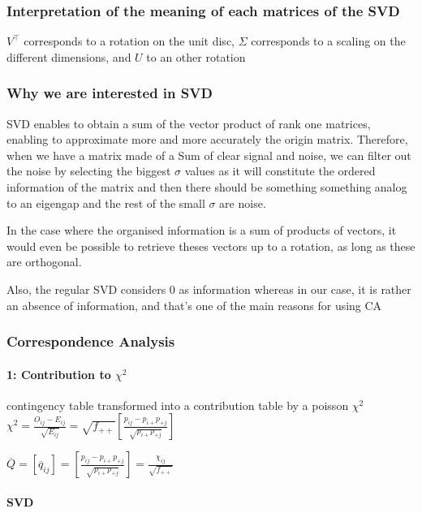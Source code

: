 \documentclass{article}
\begin{document}
\subsubsection{Interpretation of the meaning of each matrices of the SVD}

$V^\intercal$ corresponds to a rotation on the unit disc, $\Sigma$ corresponds to a  scaling on the different dimensions, and $U$ to an other rotation 

\subsubsection{Why we are interested in SVD}

SVD enables to obtain a sum of the vector product of rank one matrices, enabling to approximate more and more accurately the origin matrix. Therefore, when we have a matrix made of a Sum of clear signal and noise, we can filter out the noise by selecting the biggest $\sigma$ values as it will constitute the ordered information of the matrix and then there should be something something analog to an eigengap and the rest of the small $\sigma$ are noise.

In the case where the organised information is a sum of products of vectors, it would even be possible to retrieve theses vectors up to a rotation, as long as these are orthogonal.

Also, the regular SVD considers 0 as information whereas in our case, it is rather an absence of information, and that's one of the main reasons for using CA

\subsubsection{Correspondence Analysis}

\paragraph{1: Contribution to $\chi^2$}

contingency table transformed into a contribution table by a poisson $\chi^2$ 
$\chi^2 = \frac{O_{ij} -  E_{ij}}{\sqrt{E_{ij}}} = \sqrt{f_{++}}[\frac{p_{ij} - p_{i+}p_{+j}}{\sqrt{p_{i+}p_{+j}}}]$

$\overline{Q} = [\overline{q}_{ij}] = [\frac{p_{ij} - p_{i+}p_{+j}}{\sqrt{p_{i+}p_{+j}}}] = \frac{\chi_{ij}}{\sqrt{f_{++}}}$

\paragraph{SVD}
\end{document}
